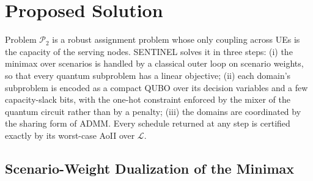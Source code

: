 
\section{Proposed Solution}

Problem $\mathscr{P}_{2}$ is a robust assignment problem whose only coupling across UEs is the capacity of the
serving nodes. SENTINEL solves it in three steps: (i) the minimax over scenarios is handled by a classical outer loop
on scenario weights, so that every quantum subproblem has a linear objective; (ii) each domain's subproblem is encoded
as a compact QUBO over its decision variables and a few capacity-slack bits, with the one-hot constraint enforced by
the mixer of the quantum circuit rather than by a penalty; (iii) the domains are coordinated by the sharing form of
ADMM. Every schedule returned at any step is certified exactly by its worst-case AoII over $\mathscr{L}$.

\subsection{Scenario-Weight Dualization of the Minimax}

